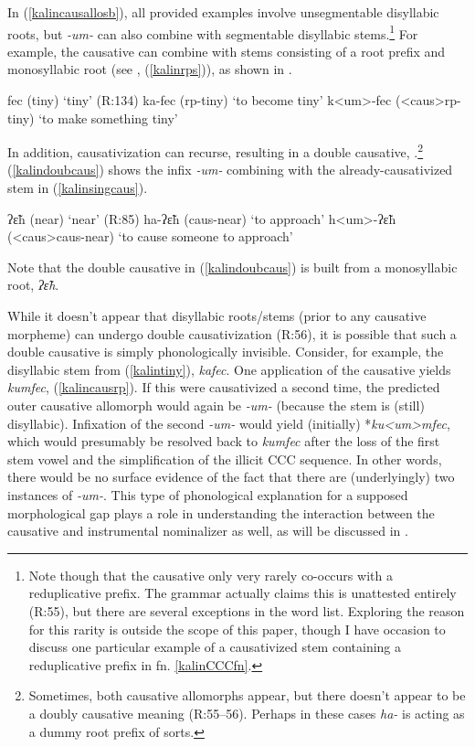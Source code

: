 \documentclass[output=paper]{langscibook}
\begin{document}
In (\ref{kalincausallosb}), all provided examples involve unsegmentable disyllabic roots, but \textit{-um-} can also combine with segmentable disyllabic stems.\footnote{Note though that the causative only very rarely co-occurs with a reduplicative prefix. The grammar actually claims this is unattested entirely (R:55), but there are several exceptions in the word list. Exploring the reason for this rarity is outside the scope of this paper, though I have occasion to discuss one particular example of a causativized stem containing a reduplicative prefix in fn. \ref{kalinCCCfn}.\label{kalinredfn}} For example, the causative can combine with stems consisting of a root prefix and monosyllabic root (see , (\ref{kalinrps})), as shown in \Next.

\ea \ea fec (tiny) \hfill `tiny' (R:134)
\ex ka-fec ({\sc rp}-tiny) \hfill `to become tiny'\label{kalintiny}
\ex\label{kalincausrp} k<um>-fec ({\sc <caus>rp}-tiny) \hfill `to make something tiny'
\z
\z

\noindent In addition, causativization can recurse, resulting in a double causative, \Next.\footnote{Sometimes, both causative allomorphs appear, but there doesn't appear to be a doubly causative meaning (R:55--56). Perhaps in these cases \textit{ha-} is acting as a dummy root prefix of sorts.} (\ref{kalindoubcaus}) 
shows the infix \textit{-um-} combining with the already-causativized stem in (\ref{kalinsingcaus}).%

\ea \ea ʔ\~εh (near) \hfill `near'  (R:85)
\ex ha-ʔ\~εh ({\sc caus-}near) \hfill `to approach'\label{kalinsingcaus}
\ex\label{kalindoubcaus} h<um>-ʔ\~εh ({\sc <caus>caus-}near)  \hfill `to cause someone to approach'
\z
\z

\noindent Note that the double causative in (\ref{kalindoubcaus}) is built from a monosyllabic root, \textit{ʔ\~εh}. 

While it doesn't appear that disyllabic roots/stems (prior to any causative morpheme) can undergo double causativization (R:56), it is possible that such a double causative is simply phonologically invisible. Consider, for example, the disyllabic stem from (\ref{kalintiny}), \textit{kafec}. One application of the causative yields \textit{kumfec}, (\ref{kalincausrp}). If this were causativized a second time, the predicted outer causative allomorph would again be \textit{-um-} (because the stem is (still) disyllabic). Infixation of the second \textit{-um-} would yield (initially) *\textit{ku<um>mfec}, which would presumably be resolved back to \textit{kumfec} after the loss of the first stem vowel and the simplification of the illicit CCC sequence. In other words, there would be no surface evidence of the fact that there are (underlyingly) two instances of \textit{-um-}. This type of phonological explanation for a supposed morphological gap plays a role in understanding the interaction between the causative and instrumental nominalizer as well, as will be discussed in .
\end{document}

